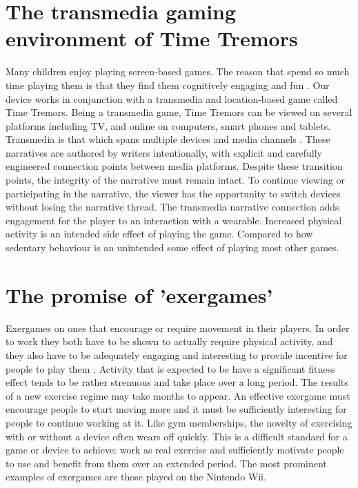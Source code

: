 \documentclass{SIGCHI2015LaTex/sigchi}
\begin{document}
\section{The transmedia gaming environment of Time Tremors}
Many children enjoy playing screen-based games. The reason that spend so much time playing them is that they find them cognitively engaging and fun \cite{gee2003video}. Our device works in conjunction with a transmedia and location-based game called Time Tremors. Being a transmedia game, Time Tremors can be viewed on several platforms including TV, and online on computers, smart phones and tablets. Transmedia is that which spans multiple devices and media channels \cite{phillips2012creators}. These narratives are authored by writers intentionally, with explicit and carefully engineered connection points between media platforms. Despite these transition points, the integrity of the narrative must remain intact. To continue viewing or participating in the narrative, the viewer has the opportunity to switch devices without losing the narrative thread. The transmedia narrative connection adds engagement for the player to an interaction with a wearable. Increased physical activity is an intended side effect of playing the game. Compared to how sedentary behaviour is an unintended some effect of playing most other games.

\section{The promise of 'exergames'}
Exergames on ones that encourage or require movement in their players. In order to work they both have to be shown to actually require physical activity, and they also have to be adequately engaging and interesting to provide incentive for people to play them \cite{whitehead2010exergame}. Activity that is expected to be have a significant fitness effect tends to be rather strenuous and take place over a long period. The results of a new exercise regime may take months to appear. An effective exergame must encourage people to start moving more and it must be sufficiently interesting for people to continue working at it. Like gym memberships, the novelty of exercising with or without a device often wears off quickly. This is a difficult standard for a game or device to achieve: work as real exercise and sufficiently motivate people to use and benefit from them over an extended period. The most prominent examples of exergames are those played on the Nintendo Wii. 
\end{document}
